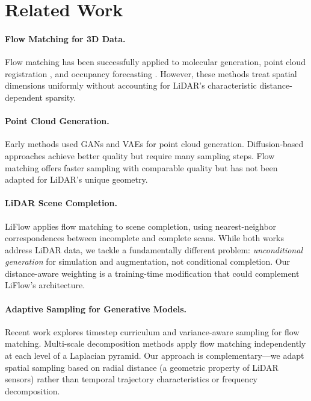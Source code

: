 \documentclass{article}
\begin{document}
\section{Related Work}

\paragraph{Flow Matching for 3D Data.} Flow matching has been successfully applied to molecular generation, point cloud registration \citep{sun2025rap}, and occupancy forecasting \citep{zhao2024dynamiccity}. However, these methods treat spatial dimensions uniformly without accounting for LiDAR's characteristic distance-dependent sparsity.

\paragraph{Point Cloud Generation.} Early methods used GANs and VAEs for point cloud generation. Diffusion-based approaches \citep{luo2021diffusion} achieve better quality but require many sampling steps. Flow matching offers faster sampling with comparable quality but has not been adapted for LiDAR's unique geometry.

\paragraph{LiDAR Scene Completion.} LiFlow \citep{matteazzi2026liflow} applies flow matching to scene completion, using nearest-neighbor correspondences between incomplete and complete scans. While both works address LiDAR data, we tackle a fundamentally different problem: \emph{unconditional generation} for simulation and augmentation, not conditional completion. Our distance-aware weighting is a training-time modification that could complement LiFlow's architecture.

\paragraph{Adaptive Sampling for Generative Models.} Recent work explores timestep curriculum \citep{sun2026curriculum} and variance-aware sampling \citep{tariq2026adaptive} for flow matching. Multi-scale decomposition methods apply flow matching independently at each level of a Laplacian pyramid. Our approach is complementary---we adapt spatial sampling based on radial distance (a geometric property of LiDAR sensors) rather than temporal trajectory characteristics or frequency decomposition.
\end{document}
